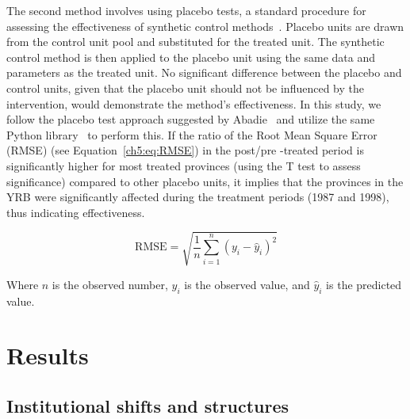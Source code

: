 \documentclass[preprint, 12pt]{elsarticle}
\begin{document}
The second method involves using placebo tests, a standard procedure for assessing the effectiveness of synthetic control methods~\cite{abadie2010}.
Placebo units are drawn from the control unit pool and substituted for the treated unit.
The synthetic control method is then applied to the placebo unit using the same data and parameters as the treated unit.
No significant difference between the placebo and control units, given that the placebo unit should not be influenced by the intervention, would demonstrate the method's effectiveness.
In this study, we follow the placebo test approach suggested by Abadie~\cite{abadie2010} and utilize the same Python library~\cite{engelbrektson2023} to perform this.
If the ratio of the Root Mean Square Error (RMSE) (see Equation~\ref{ch5:eq:RMSE}) in the post/pre -treated period is significantly higher for most treated provinces (using the T test to assess significance) compared to other placebo units, it implies that the provinces in the YRB were significantly affected during the treatment periods (1987 and 1998), thus indicating effectiveness.

\begin{equation}
    \label{ch5:eq:RMSE}
    \text{RMSE} = \sqrt{\frac{1}{n}\sum_{i=1}^{n}{(y_i-\hat{y}_i)}^2}
\end{equation}

Where $n$ is the observed number, $y_i$ is the observed value, and $\hat{y}_i$ is the predicted value.

\section{Results}\label{sec:results}


\subsection{Institutional shifts and structures}\label{results-1}
\end{document}
